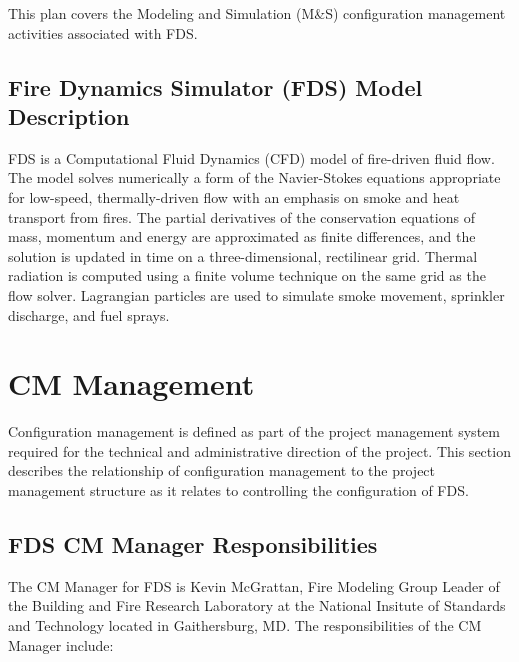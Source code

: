 \documentclass[11pt]{book}
\begin{document}
This plan covers the Modeling and Simulation (M\&S) configuration management activities associated with FDS.

\section{Fire Dynamics Simulator (FDS) Model Description}

FDS is a Computational Fluid Dynamics (CFD) model of fire-driven fluid flow.
The model solves numerically a form of the Navier-Stokes equations appropriate
for low-speed, thermally-driven flow with an emphasis on smoke and heat transport
from fires. The partial derivatives of the conservation equations of mass, momentum and energy are approximated
as finite differences, and the solution is updated in time on a three-dimensional, rectilinear grid.
Thermal radiation is computed using a finite volume technique on the same grid as the flow solver.
Lagrangian particles are used to simulate smoke movement, sprinkler discharge, and fuel sprays.

\chapter{CM Management}

Configuration management is defined as part of the project management system required for the technical and
administrative direction of the project.  This section describes the relationship of configuration management
to the project management structure as it relates to controlling the configuration of FDS.

\section{FDS CM Manager Responsibilities}

The CM Manager for FDS is Kevin McGrattan, Fire Modeling Group Leader of the Building and Fire Research
Laboratory at the National Insitute of Standards and Technology located in Gaithersburg, MD.  The responsibilities
of the CM Manager include:
\end{document}
